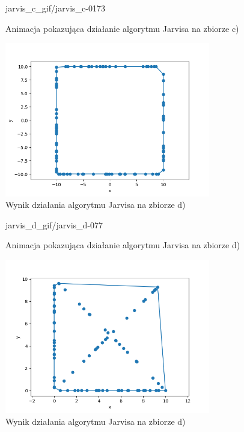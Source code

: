\documentclass[a4paper]{article}
\begin{document}
\begin{figure}[H]
    {jarvis_c_gif/jarvis_c-}{0}{173}
    \centering
    \caption{Animacja pokazująca działanie algorytmu Jarvisa na zbiorze c)}
    \label{fig:anim_jarvis_c}
\end{figure}

\begin{figure}[H]
    \centering
    \includegraphics[width=0.8\textwidth]{jarvis/jarvis_c_png.png}
    \caption{Wynik działania algorytmu Jarvisa na zbiorze d)}
    \label{fig:jarvis_c}
\end{figure}

\begin{figure}[H]
    {jarvis_d_gif/jarvis_d-}{0}{77}
    \centering
    \caption{Animacja pokazująca działanie algorytmu Jarvisa na zbiorze d)}
    \label{fig:anim_jarvis_d}
\end{figure}

\begin{figure}[H]
    \centering
    \includegraphics[width=0.8\textwidth]{jarvis/jarvis_d_png.png}
    \caption{Wynik działania algorytmu Jarvisa na zbiorze d)}
    \label{fig:jarvis_d}
\end{figure}
\end{document}
